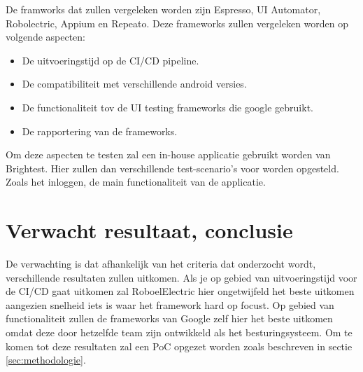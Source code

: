 De framworks dat zullen vergeleken worden zijn Espresso, UI Automator, Robolectric, Appium en Repeato.
Deze frameworks zullen vergeleken worden op volgende aspecten:
\begin{itemize}
	\item De uitvoeringstijd op de CI/CD pipeline.
	\item De compatibiliteit met verschillende android versies.
	\item De functionaliteit tov de UI testing frameworks die google gebruikt.
	\item De rapportering van de frameworks.
\end{itemize}

Om deze aspecten te testen zal een in-house applicatie gebruikt worden van Brightest.
Hier zullen dan verschillende test-scenario's voor worden opgesteld. Zoals het inloggen, de main functionaliteit van de applicatie.

\section{Verwacht resultaat, conclusie}%
\label{sec:verwachte_resultaten}

De verwachting is dat afhankelijk van het criteria dat onderzocht wordt, verschillende resultaten zullen uitkomen.
Als je op gebied van uitvoeringstijd voor de CI/CD gaat uitkomen zal RoboelElectric hier ongetwijfeld het beste uitkomen aangezien snelheid iets is waar het framework hard op focust. Op gebied van functionaliteit zullen de frameworks van Google zelf hier het beste uitkomen omdat deze door hetzelfde team zijn ontwikkeld als het besturingsysteem. Om te komen tot deze resultaten zal een PoC opgezet worden zoals beschreven in sectie \ref{sec:methodologie}.


